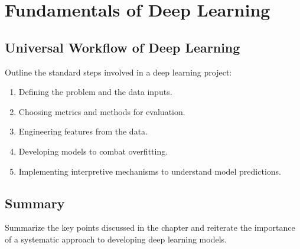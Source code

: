 \chapter{Fundamentals of Deep Learning}








\section{Universal Workflow of Deep Learning}
\label{sc: udl}
Outline the standard steps involved in a deep learning project:
\begin{enumerate}
    \item Defining the problem and the data inputs.
    \item Choosing metrics and methods for evaluation.
    \item Engineering features from the data.
    \item Developing models to combat overfitting.
    \item Implementing interpretive mechanisms to understand model predictions.
\end{enumerate}



\section{Summary}
Summarize the key points discussed in the chapter and reiterate the importance of a systematic approach to developing deep learning models.


